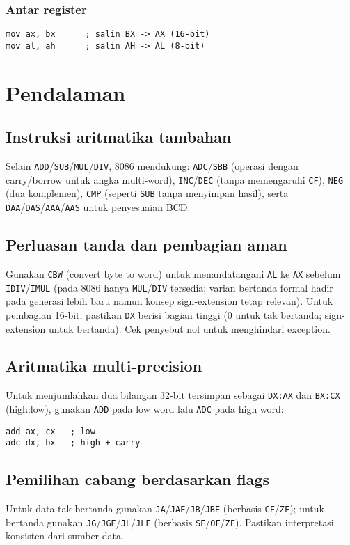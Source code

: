 \subsubsection{Antar register}
\begin{verbatim}
mov ax, bx      ; salin BX -> AX (16-bit)
mov al, ah      ; salin AH -> AL (8-bit)
\end{verbatim}

\section{Pendalaman}\label{sec:aritmatika-pendalaman}
\subsection{Instruksi aritmatika tambahan}
Selain \texttt{ADD}/\texttt{SUB}/\texttt{MUL}/\texttt{DIV}, 8086 mendukung: \texttt{ADC}/\texttt{SBB} (operasi dengan carry/borrow untuk angka multi-word), \texttt{INC}/\texttt{DEC} (tanpa memengaruhi \texttt{CF}), \texttt{NEG} (dua komplemen), \texttt{CMP} (seperti \texttt{SUB} tanpa menyimpan hasil), serta \texttt{DAA}/\texttt{DAS}/\texttt{AAA}/\texttt{AAS} untuk penyesuaian BCD. \cite{intel2019manual32,rbil}

\subsection{Perluasan tanda dan pembagian aman}
Gunakan \texttt{CBW} (convert byte to word) untuk menandatangani \texttt{AL} ke \texttt{AX} sebelum \texttt{IDIV}/\texttt{IMUL} (pada 8086 hanya \texttt{MUL}/\texttt{DIV} tersedia; varian bertanda formal hadir pada generasi lebih baru namun konsep sign-extension tetap relevan). Untuk pembagian 16-bit, pastikan \texttt{DX} berisi bagian tinggi (0 untuk tak bertanda; sign-extension untuk bertanda). Cek penyebut nol untuk menghindari exception. \cite{intel2019manual32}

\subsection{Aritmatika multi-precision}
Untuk menjumlahkan dua bilangan 32-bit tersimpan sebagai \texttt{DX:AX} dan \texttt{BX:CX} (high:low), gunakan \texttt{ADD} pada low word lalu \texttt{ADC} pada high word:
\begin{verbatim}
add ax, cx   ; low
adc dx, bx   ; high + carry
\end{verbatim}

\subsection{Pemilihan cabang berdasarkan flags}
Untuk data tak bertanda gunakan \texttt{JA}/\texttt{JAE}/\texttt{JB}/\texttt{JBE} (berbasis \texttt{CF}/\texttt{ZF}); untuk bertanda gunakan \texttt{JG}/\texttt{JGE}/\texttt{JL}/\texttt{JLE} (berbasis \texttt{SF}/\texttt{OF}/\texttt{ZF}). Pastikan interpretasi konsisten dari sumber data. \cite{intel2019manual32}

